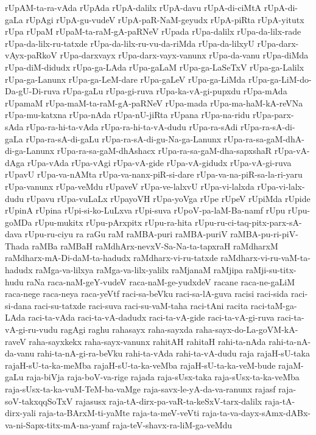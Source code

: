 {rUpAM-ta-ra-vAda
rUpAda
rUpA-dalilx
rUpA-davu
rUpA-di-ciMtA
rUpA-di-gaLa
rUpAgi
rUpA-gu-vudeV
rUpA-paR-NaM-geyudx
rUpA-piRta
rUpA-yitutx
rUpa
rUpaM
rUpaM-ta-raM-gA-paRNeV
rUpada
rUpa-dalilx
rUpa-da-lilx-rade
rUpa-da-lilx-ru-tatxde
rUpa-da-lilx-ru-vu-da-riMda
rUpa-da-lilxyU
rUpa-darx-vAyx-paRkoV
rUpa-darxvayx
rUpa-darx-vayx-vanunx
rUpa-da-vanu
rUpa-diMda
rUpa-diM-didudx
rUpa-ga-LAda
rUpa-gaLaM
rUpa-ga-LaSeTxV
rUpa-ga-Lalilx
rUpa-ga-Lanunx
rUpa-ga-LeM-dare
rUpa-gaLeV
rUpa-ga-LiMda
rUpa-ga-LiM-do-Da-gU-Di-ruva
rUpa-gaLu
rUpa-gi-ruva
rUpa-ka-vA-gi-pupxdu
rUpa-mAda
rUpamaM
rUpa-maM-ta-raM-gA-paRNeV
rUpa-mada
rUpa-ma-haM-kA-reVNa
rUpa-mu-katxna
rUpa-nAda
rUpa-nU-jiRta
rUpana
rUpa-na-ridu
rUpa-parx-sAda
rUpa-ra-hi-ta-vAda
rUpa-ra-hi-ta-vA-dudu
rUpa-ra-sAdi
rUpa-ra-sA-di-gaLa
rUpa-ra-sA-di-gaLu
rUpa-ra-sA-di-gu-Na-ga-Lanunx
rUpa-ra-sa-gaM-dhA-di-ga-Lanunx
rUpa-ra-sa-gaM-dhAshacx
rUpa-ra-sa-gaM-dha-sapxshaR
rUpa-vA-dAga
rUpa-vAda
rUpa-vAgi
rUpa-vA-gide
rUpa-vA-gidudx
rUpa-vA-gi-ruva
rUpavU
rUpa-va-nAMta
rUpa-va-nanx-piR-si-dare
rUpa-va-na-piR-sa-la-ri-yaru
rUpa-vanunx
rUpa-veMdu
rUpaveV
rUpa-ve-lalxvU
rUpa-vi-lalxda
rUpa-vi-lalx-dudu
rUpavu
rUpa-vuLaLx
rUpayoVH
rUpa-yoVga
rUpe
rUpeV
rUpiMda
rUpide
rUpinA
rUpina
rUpi-si-ko-LuLxva
rUpi-suva
rUpoV-pa-laM-Ba-namf
rUpu
rUpu-goMDa
rUpu-mukitx
rUpu-pArxpitx
rUpu-ra-hita
rUpu-ru-ci-taq-pitx-parx-sA-dava
rUpu-ru-ciyu
ra
raGu
raM
raMBA-puri
raMBA-puriV
raMBA-pu-ri-piV-Thada
raMBa
raMBaH
raMdhArx-nevxV-Sa-Na-ta-tapxraH
raMdharxM
raMdharx-mA-Di-daM-ta-hadudx
raMdharx-vi-ru-tatxde
raMdharx-vi-ru-vaM-ta-hadudx
raMga-va-lilxya
raMga-va-lilx-yalilx
raMjanaM
raMjipa
raMji-su-titx-hudu
raNa
raca-naM-geY-vudeV
raca-naM-ge-yudxdeV
racane
raca-ne-gaLiM
raca-nege
raca-neya
raca-yeVtf
raci-sa-beVku
raci-sa-lA-guva
racisi
raci-sida
raci-si-dana
raci-su-tatxde
raci-suva
raci-su-vaM-taha
raci-tAni
racita
raci-taM-ga-LAda
raci-ta-vAda
raci-ta-vA-dadudx
raci-ta-vA-gide
raci-ta-vA-gi-ruva
raci-ta-vA-gi-ru-vudu
ragAgi
raghu
rahasayx
raha-sayxda
raha-sayx-do-La-goVM-kA-raveV
raha-sayxkekx
raha-sayx-vanunx
rahitAH
rahitaH
rahi-ta-nAda
rahi-ta-nA-da-vanu
rahi-ta-nA-gi-ra-beVku
rahi-ta-vAda
rahi-ta-vA-dudu
raja
rajaH-sU-taka
rajaH-sU-ta-ka-meMba
rajaH-sU-ta-ka-veMba
rajaH-sU-ta-ka-veM-bude
rajaM-gaLu
raja-biVja
raja-boV-va-rige
rajada
raja-sUsx-taka
raja-sUsx-ta-ka-veMba
raja-sUsx-ta-ka-vuM-TeM-ba-vaMge
raja-savx-le-yA-da-va-ranunx
rajasf
raja-soV-takxqqSoTxV
rajasusx
raja-tA-dirx-pa-vaR-ta-keSxV-tarx-dalilx
raja-tA-dirx-yali
raja-ta-BArxM-ti-yaMte
raja-ta-meV-veVti
raja-ta-va-dayx-sAmx-dABx-va-ni-Sapx-titx-mA-na-yamf
raja-teV-shavx-ra-liM-ga-veMdu
}
